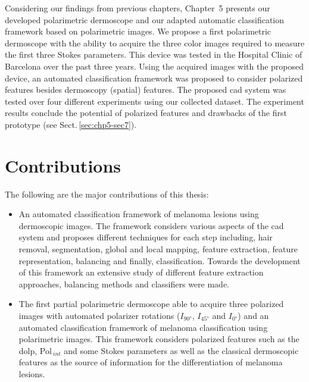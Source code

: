 Considering our findings from previous chapters, Chapter~5 presents our developed polarimetric dermoscope and our adapted automatic classification framework based on polarimetric images.
We propose a first polarimetric dermoscope with the ability to acquire the three color images required to measure the first three Stokes parameters.
This device was tested in the Hospital Clinic of Barcelona over the past three years.
Using the acquired images with the proposed device, an automated classification framework was proposed to consider polarized features besides dermoscopy (spatial) features. 
The proposed \ac{cad} system was tested over four different experiments using our collected dataset.
The experiment results conclude the potential of polarized features and drawbacks of the first prototype (see Sect.\,\ref{sec:chp5-sec7}).



\section{Contributions}\label{sec:chp6-sec2}
The following are the major contributions of this thesis: 
\begin{itemize}
\item An automated classification framework of melanoma lesions using dermoscopic images.
The framework considers various aspects of the \ac{cad} system and proposes different techniques for each step including, hair removal, segmentation, global and local mapping, feature extraction, feature representation, balancing and finally, classification.
Towards the development of this framework an extensive study of different feature extraction approaches, balancing methods and classifiers were made.
\item The first partial polarimetric dermoscope able to acquire three polarized images with automated polarizer rotations ($I_{\ang{90}}$, $I_{\ang{45}}$ and $I_{\ang{0}}$) and an automated classification framework of melanoma classification using polarimetric images.
This framework considers polarized features such as the \ac{dolp}, Pol$_{~int}$ and some Stokes parameters as well as the classical dermoscopic features as the source of information for the differentiation of melanoma lesions.
\end{itemize}

